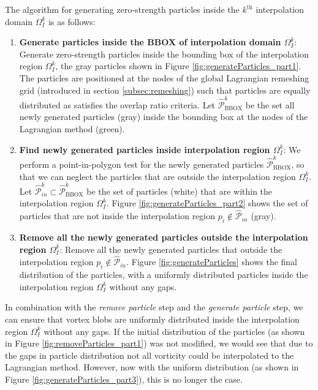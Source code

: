 	The algorithm for generating zero-strength particles inside the $k^{\mathrm{th}}$ interpolation domain $\Omega_{I}^k$ is as follows:
	\begin{enumerate}[label=3.\alph*)]
	\item \textbf{Generate particles inside the BBOX of interpolation domain $\Omega_I^k$}: Generate zero-strength particles inside the bounding box of the interpolation region $\Omega_{I}^k$, the gray particles shown in Figure \ref{fig:generateParticles_part1}. The particles are positioned at the nodes of the global Lagrangian remeshing grid (introduced in section \ref{subsec:remeshing}) such that particles are equally distributed as satisfies the overlap ratio criteria. Let $\hat{\mathcal{P}}_{\mathrm{BBOX}}^k$ be the set all newly generated particles (gray) inside the bounding box at the nodes of the Lagrangian method (green).
	
	\item \textbf{Find newly generated particles inside interpolation region $\Omega_I^k$}: We perform a point-in-polygon test for the newly generated particles $\hat{\mathcal{P}}_{\mathrm{BBOX}}^k$, so that we can neglect the particles that are outside the interpolation region $\Omega_{I}^k$. Let $\hat{\mathcal{P}}_{in}^k \subset \hat{\mathcal{P}}_{\mathrm{BBOX}}^k$ be the set of particles (white) that are within the interpolation region $\Omega_{I}^k$. Figure \ref{fig:generateParticles_part2} shows the set of particles that are not inside the interpolation region $p_i\notin\hat{\mathcal{P}}_{in}$ (gray).
	
	\item \textbf{Remove all the newly generated particles outside the interpolation region $\Omega_{I}^k$}: Remove all the newly generated particles that outside the interpolation region $p_i \notin \hat{\mathcal{P}}_{in}$. Figure \ref{fig:generateParticles} shows the final distribution of the particles, with a uniformly distributed particles inside the interpolation region $\Omega_I^k$ without any gaps.
	\end{enumerate}
	
	In combination with the \textit{remove particle} step and the \textit{generate particle} step, we can ensure that vortex blobs are uniformly distributed inside the interpolation region $\Omega_I^k$ without any gaps. If the initial distribution of the particles (as shown in Figure \ref{fig:removeParticles_part1}) was not modified, we would see that due to the gaps in particle distribution not all vorticity could be interpolated to the Lagrangian method. However, now with the uniform distribution (as shown in Figure \ref{fig:generateParticles_part3}), this is no longer the case.
	
